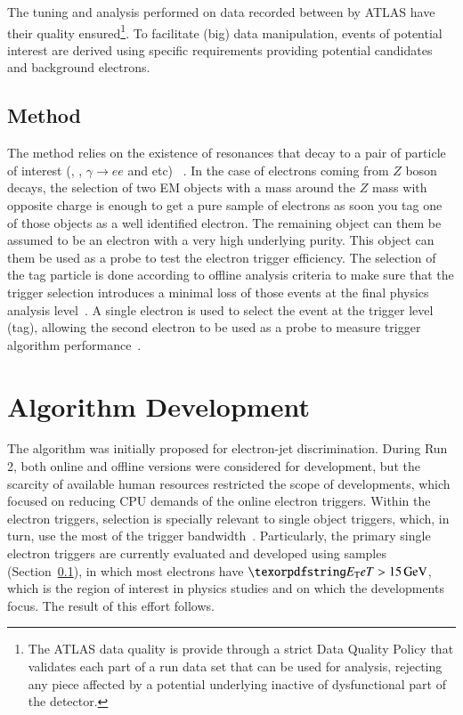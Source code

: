 The tuning and analysis performed on data recorded between by ATLAS have their quality ensured\footnote{The ATLAS data quality is provide through a strict Data Quality Policy that validates each part of a run data set that can be used for analysis, rejecting any piece affected by a potential underlying inactive of dysfunctional part of the detector.}. To facilitate (big) data manipulation, events of potential interest are derived using specific requirements providing potential \Zee{} \tnp{} candidates and background electrons. 

%


\subsection{\TnP Method}\label{ssec:tnp}

The \tnp{} method relies on the existence of resonances that decay to a pair of particle of interest (\Zee{}, \Jee{}, $\gamma \rightarrow ee$ and etc) ~\cite{PERF-2016-01}. In the case of electrons coming from $Z$ boson decays, the selection of two EM objects with a mass around the $Z$ mass with opposite charge is enough to get a pure sample of electrons as soon you tag one of those objects as a well identified electron. The remaining object can them be assumed to be an electron with a very high underlying purity. This object can them be used as a probe to test the electron trigger efficiency. The selection of the tag particle is done according to offline analysis criteria to make sure that the trigger selection introduces a minimal loss of those events at the final physics analysis level~\cite{aaboud2019electron}. A single electron is used to select the event at the trigger level (tag), allowing the second electron to be used as a probe to measure trigger algorithm performance~\cite{aad2020performance}.


\section{Algorithm Development}\label{ssec:rnn_for_online_and_eletrons}

The \rnn{} algorithm was initially proposed for electron-jet discrimination. 
During Run 2, both online and offline versions
were considered for  development, but the scarcity of available human resources restricted the scope of developments, which focused on reducing CPU demands of the online electron triggers. Within the electron triggers, \hlt{} selection is
specially relevant to single object triggers, which, in turn, use the most of the trigger bandwidth~\cite{aad2020performance}. Particularly, the primary single electron triggers
are currently evaluated and developed using \Zee{} \tnp{} samples 
(Section~\ref{ssec:tnp}), in which most electrons have $\et>\SI{15}{\GeV}$, which is the region of interest in physics studies and on which the \rnn{} developments focus. The result of this effort
follows.


